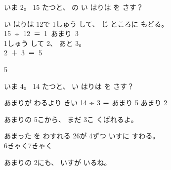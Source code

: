 \begin{reidai}
\noindent\begin{minipage}[c]{0.66\linewidth}
いま \mbox{2}。 \mbox{15} たつと、 \mbox{}の い はりは \mbox{}を さす？

\kangaekata {}い はりは \mbox{12}で 1しゅう して、 じ ところに もどる。\\
\bkqnkindent\mbox{15 ÷ 12 ＝ 1 あまり 3}\\
\bkqnkindent 1しゅう して 2、 あと 3。\\
\bkqnkindent\mbox{2 ＋ 3 ＝ 5}
\end{minipage}\hfill
\begin{minipage}[c]{0.32\linewidth}\centering
{}
\end{minipage}

\kotae \mbox{5}
\end{reidai}

\begin{jibun}
いま \mbox{4}。 \mbox{14} たつと、 い はりは \mbox{}を さす？
\bkshikiran[9\zw]
\end{jibun}


\begin{tsumazuki}{あまりが わるより きい}
14 ÷ 3 ＝\enspace\bkbatsu{} あまり 5\hspace{2\zw}\bkmaru{} あまり 2\par
あまりの 5こから、 まだ 3こ くばれるよ。
\end{tsumazuki}

\begin{tsumazuki}{あまった を わすれる}
\mbox{26}が \mbox{4}ずつ いすに すわる。\\
\bkbatsu\enspace 6きゃく\hspace{3\zw}\bkmaru\enspace 7きゃく\par
あまりの \mbox{2}にも、 いすが いるね。
\end{tsumazuki}

